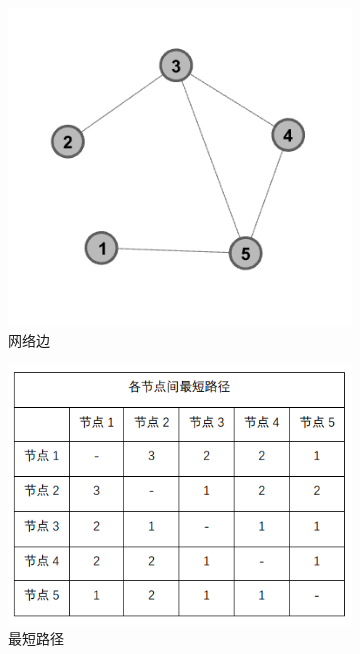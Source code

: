 \documentclass[bachelor,adobefonts]{jnuthesis}
\begin{document}
\begin{figure}[h!]
  \centering
    \begin{subfigure}[b]{0.49\linewidth}
      \includegraphics[width=\linewidth]{biantexing.png}
      \caption{网络边}
    \end{subfigure}
    \begin{subfigure}[b]{0.49\linewidth}
      \includegraphics[width=\linewidth]{bian1.png}
      \caption{最短路径}
    \end{subfigure}
    \begin{subfigure}[b]{0.49\linewidth}

\end{subfigure}
\end{figure}
\end{document}
